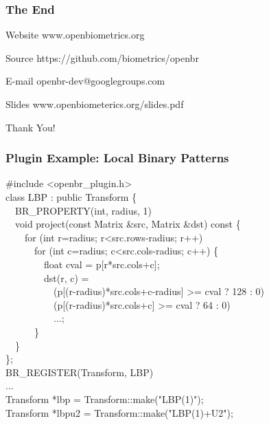 \documentclass[12pt]{beamer}
\begin{document}
\begin{frame}
\frametitle{The End}
\begin{block}{Website}
\centering
www.openbiometrics.org
\end{block}
\begin{block}{Source}
\centering
https://github.com/biometrics/openbr
\end{block}
\begin{block}{E-mail}
\centering
openbr-dev@googlegroups.com
\end{block}
\begin{block}{Slides}
\centering
www.openbiometerics.org/slides.pdf
\end{block}
\begin{center}
Thank You!
\end{center}
\end{frame}

\begin{frame}[fragile]
\frametitle{Plugin Example: Local Binary Patterns}
{\footnotesize
\pause
\#include  \textless openbr\_plugin.h\textgreater \\
\pause
class LBP : public Transform \{ \\
\pause
\ \ BR\_PROPERTY(int, radius, 1) \\
\pause
\ \ void project(const Matrix \&src, Matrix \&dst) const \{ \\
\pause
\ \ \ \ for (int r=radius; r\textless src.rows-radius; r++) \\
\ \ \ \ \ \ for (int c=radius; c\textless src.cols-radius; c++) \{ \\
\ \ \ \ \ \ \ \ float cval = p[r*src.cols+c]; \\
\ \ \ \ \ \ \ \ dst(r, c) = \\
\ \ \ \ \ \ \ \ \ \ (p[(r-radius)*src.cols+c-radius] \textgreater = cval ? 128 : 0) \textbar \\
\ \ \ \ \ \ \ \ \ \ (p[(r-radius)*src.cols+c] \textgreater = cval ? 64 : 0) \textbar \\
\ \ \ \ \ \ \ \ \ \ ...; \\
 \ \ \ \ \ \ \} \\
\pause
\ \ \} \\
\}; \\
\pause
BR\_REGISTER(Transform, LBP) \\
\pause
... \\
Transform *lbp = Transform::make("LBP(1)"); \\
\pause
Transform *lbpu2 = Transform::make("LBP(1)+U2"); \\
}
\end{frame}

\end{document}
